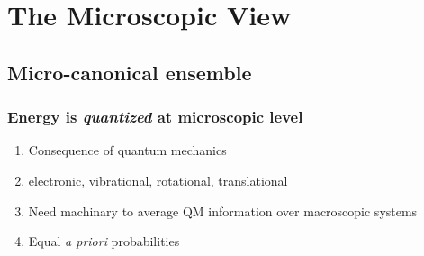 \documentclass[11pt]{article}
\begin{document}
\section{The Microscopic View}
\label{sec:orgb202593}
\subsection{Micro-canonical ensemble}
\label{sec:orgc029125}
\subsubsection{Energy is \emph{quantized} at microscopic level}
\label{sec:org9653838}
\begin{enumerate}
\item Consequence of quantum mechanics
\item electronic, vibrational, rotational, translational
\item Need machinary to average QM information over macroscopic systems
\item Equal \emph{a priori} probabilities
\end{enumerate}
\end{document}
